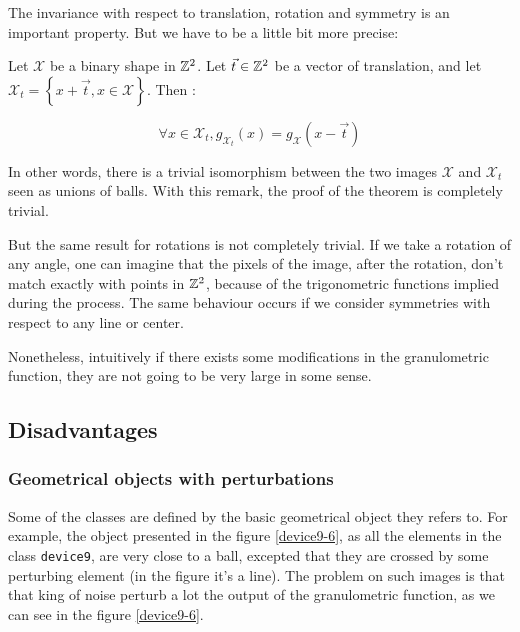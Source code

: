 The invariance with respect to translation, rotation and symmetry is an important property. But we have to be a little bit more precise:

\begin{theo}
	Let $\mathcal{X}$ be a binary shape in $\mathbb{Z}^{2}$. Let $\vec{t} \in \mathbb{Z}^{2}$ be a vector of translation, and let $\mathcal{X}_{t} = \left\{ x + \vec{t}, x \in \mathcal{X} \right\}$. Then :
	
	$$ \forall x \in \mathcal{X}_{t}, g_{\mathcal{X}_{t}}(x) = g_{\mathcal{X}}(x-\vec{t}) $$
\end{theo}

In other words, there is a trivial isomorphism between the two images $\mathcal{X}$ and  $\mathcal{X}_t$ seen as unions of balls. With this remark, the proof of the theorem is completely trivial.

But the same result for rotations is not completely trivial. If we take a rotation of any angle, one can imagine that the pixels of the image, after the rotation, don't match exactly with points in $\mathbb{Z}^{2}$, because of the trigonometric functions implied during the process. The same behaviour occurs if we consider symmetries with respect to any line or center.

Nonetheless, intuitively if there exists some modifications in the granulometric function, they are not going to be very large in some sense.


\subsection{Disadvantages}

\subsubsection{Geometrical objects with perturbations}

Some of the classes are defined by the basic geometrical object they refers to. For example, the object presented in the figure \ref{device9-6}, as all the elements in the class \texttt{device9}, are very close to a ball, excepted that they are crossed by some perturbing element (in the figure it's a line). The problem on such images is that that king of noise perturb a lot the output of the granulometric function, as we can see in the figure \ref{device9-6}.

